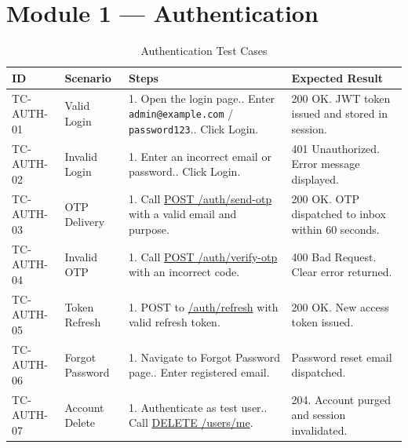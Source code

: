 \documentclass[11pt,a4paper]{report}
\begin{document}
\section{Module 1 --- Authentication}

\begin{xltabular}{\textwidth}{|L{2.5cm}|L{2.5cm}|X|L{3.5cm}|}
\caption{Authentication Test Cases} \\
\hline
{} \textbf{ID} & \textbf{Scenario} & \textbf{Steps} & \textbf{Expected Result} \\ \hline
\endhead

TC-AUTH-01 & Valid Login &
1. Open the login page.. Enter \texttt{admin@example.com} / \texttt{password123}.. Click Login. &
200 OK. JWT token issued and stored in session. \\ \hline

TC-AUTH-02 & Invalid Login &
1. Enter an incorrect email or password.. Click Login. &
401 Unauthorized. Error message displayed. \\ \hline

TC-AUTH-03 & OTP Delivery &
1. Call \url{POST /auth/send-otp} with a valid email and purpose. &
200 OK. OTP dispatched to inbox within 60 seconds. \\ \hline

TC-AUTH-04 & Invalid OTP &
1. Call \url{POST /auth/verify-otp} with an incorrect code. &
400 Bad Request. Clear error returned. \\ \hline

TC-AUTH-05 & Token Refresh &
1. POST to \url{/auth/refresh} with valid refresh token. &
200 OK. New access token issued. \\ \hline

TC-AUTH-06 & Forgot Password &
1. Navigate to Forgot Password page.. Enter registered email. &
Password reset email dispatched. \\ \hline

TC-AUTH-07 & Account Delete &
1. Authenticate as test user.. Call \url{DELETE /users/me}. &
204. Account purged and session invalidated. \\ \hline
\end{xltabular}
\end{document}
